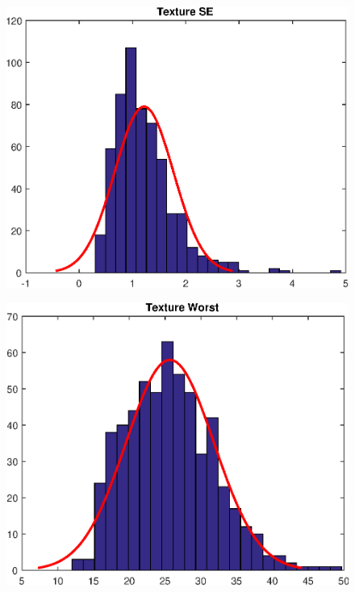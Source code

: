 \documentclass[11pt,a4paper]{article}
\numberwithin{equation}{section}
\begin{document}
\begin{itemize}
\begin{figure}[H]
\centering
\begin{minipage}{.4\textwidth}
  \centering
  \includegraphics[width=\linewidth]{./img/texture_se}
  \label{fig:test1}
\end{minipage}%
\begin{minipage}{.4\textwidth}
  \centering
  \includegraphics[width=\linewidth]{./img/texture_worst}
  \label{fig:test2}
\end{minipage}
\end{figure}


\end{itemize}
\end{document}
